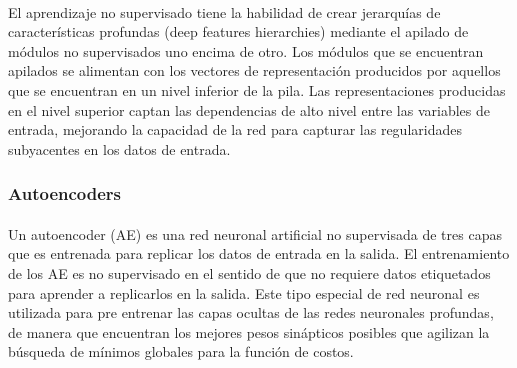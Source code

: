 \documentclass[12pt]{article}%
\begin{document}
\paragraph{}
El aprendizaje no supervisado tiene la habilidad de crear jerarquías de características profundas (deep features hierarchies) mediante el apilado de módulos no supervisados uno encima de otro. Los módulos que se encuentran apilados se alimentan con los vectores de representación producidos por aquellos que se encuentran en un nivel inferior de la pila. Las representaciones producidas en el nivel superior captan las dependencias de alto nivel entre las variables de entrada, mejorando la capacidad de la red para capturar las regularidades subyacentes en los datos de entrada.

\subsubsection{Autoencoders}
\paragraph{}
Un autoencoder (AE) es una red neuronal artificial no supervisada de tres capas que es entrenada para replicar los datos de entrada en la salida. El entrenamiento de los AE es no supervisado en el sentido de que no requiere datos etiquetados para aprender a replicarlos en la salida. Este tipo especial de red neuronal es utilizada para pre entrenar las capas ocultas de las redes neuronales profundas, de manera que encuentran los mejores pesos sinápticos posibles que agilizan la búsqueda de mínimos globales para la función de costos. 
\end{document}
